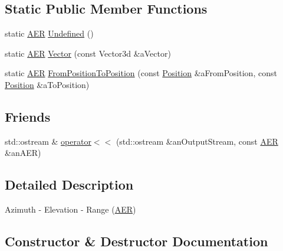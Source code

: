 \subsection*{Static Public Member Functions}
\begin{DoxyCompactItemize}
\item 
static \hyperlink{classlibrary_1_1physics_1_1coord_1_1spherical_1_1_a_e_r}{A\+ER} \hyperlink{classlibrary_1_1physics_1_1coord_1_1spherical_1_1_a_e_r_a53936583d6117c9515f8646b7d1cb897}{Undefined} ()
\item 
static \hyperlink{classlibrary_1_1physics_1_1coord_1_1spherical_1_1_a_e_r}{A\+ER} \hyperlink{classlibrary_1_1physics_1_1coord_1_1spherical_1_1_a_e_r_ad17b64ba28594943d96ca882333eec24}{Vector} (const Vector3d \&a\+Vector)
\item 
static \hyperlink{classlibrary_1_1physics_1_1coord_1_1spherical_1_1_a_e_r}{A\+ER} \hyperlink{classlibrary_1_1physics_1_1coord_1_1spherical_1_1_a_e_r_aa068fe79603bc3d6a77d3fc6279e0378}{From\+Position\+To\+Position} (const \hyperlink{classlibrary_1_1physics_1_1coord_1_1_position}{Position} \&a\+From\+Position, const \hyperlink{classlibrary_1_1physics_1_1coord_1_1_position}{Position} \&a\+To\+Position)
\end{DoxyCompactItemize}
\subsection*{Friends}
\begin{DoxyCompactItemize}
\item 
std\+::ostream \& \hyperlink{classlibrary_1_1physics_1_1coord_1_1spherical_1_1_a_e_r_ac5514fc65bf0bd3f4f5870b246cff3ad}{operator$<$$<$} (std\+::ostream \&an\+Output\+Stream, const \hyperlink{classlibrary_1_1physics_1_1coord_1_1spherical_1_1_a_e_r}{A\+ER} \&an\+A\+ER)
\end{DoxyCompactItemize}


\subsection{Detailed Description}
Azimuth -\/ Elevation -\/ Range (\hyperlink{classlibrary_1_1physics_1_1coord_1_1spherical_1_1_a_e_r}{A\+ER}) 

\subsection{Constructor \& Destructor Documentation}
\mbox{\label{classlibrary_1_1physics_1_1coord_1_1spherical_1_1_a_e_r_a40e444abec38e14d0e592d6d0dd92829}} 
